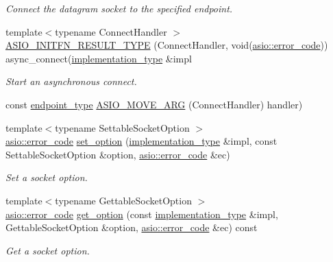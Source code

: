 \begin{DoxyCompactItemize}
\begin{DoxyCompactList}\small\item\em Connect the datagram socket to the specified endpoint. \end{DoxyCompactList}\item 
{\footnotesize template$<$typename Connect\+Handler $>$ }\\\hyperlink{classasio_1_1datagram__socket__service_a1cc8ccb4ae82f0c9b266a183a10714f6}{A\+S\+I\+O\+\_\+\+I\+N\+I\+T\+F\+N\+\_\+\+R\+E\+S\+U\+L\+T\+\_\+\+T\+Y\+P\+E} (Connect\+Handler, void(\hyperlink{classasio_1_1error__code}{asio\+::error\+\_\+code})) async\+\_\+connect(\hyperlink{classasio_1_1datagram__socket__service_a41dcdc6b8a3500d6f88e10b6c08925cd}{implementation\+\_\+type} \&impl
\begin{DoxyCompactList}\small\item\em Start an asynchronous connect. \end{DoxyCompactList}\item 
const \hyperlink{classasio_1_1datagram__socket__service_a135b71c44f1e92b67cea4402f46578a9}{endpoint\+\_\+type} \hyperlink{classasio_1_1datagram__socket__service_ab2d948e289abf080a414eeb972b81b6e}{A\+S\+I\+O\+\_\+\+M\+O\+V\+E\+\_\+\+A\+R\+G} (Connect\+Handler) handler)
\item 
{\footnotesize template$<$typename Settable\+Socket\+Option $>$ }\\\hyperlink{classasio_1_1error__code}{asio\+::error\+\_\+code} \hyperlink{classasio_1_1datagram__socket__service_ab50f979e919bc145b771b1dd7ea6b6c9}{set\+\_\+option} (\hyperlink{classasio_1_1datagram__socket__service_a41dcdc6b8a3500d6f88e10b6c08925cd}{implementation\+\_\+type} \&impl, const Settable\+Socket\+Option \&option, \hyperlink{classasio_1_1error__code}{asio\+::error\+\_\+code} \&ec)
\begin{DoxyCompactList}\small\item\em Set a socket option. \end{DoxyCompactList}\item 
{\footnotesize template$<$typename Gettable\+Socket\+Option $>$ }\\\hyperlink{classasio_1_1error__code}{asio\+::error\+\_\+code} \hyperlink{classasio_1_1datagram__socket__service_ab4dc6d5486bf61d898c934e2154de746}{get\+\_\+option} (const \hyperlink{classasio_1_1datagram__socket__service_a41dcdc6b8a3500d6f88e10b6c08925cd}{implementation\+\_\+type} \&impl, Gettable\+Socket\+Option \&option, \hyperlink{classasio_1_1error__code}{asio\+::error\+\_\+code} \&ec) const 
\begin{DoxyCompactList}\small\item\em Get a socket option. \end{DoxyCompactList}\item 

\end{DoxyCompactItemize}
